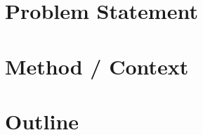\documentclass[USenglish]{uit-thesis}
\begin{document}
\section{Problem Statement}
\label{sec:probdefinition}




\section{Method / Context}
\label{sec:method}

\section{Outline}
\label{sec:outline}
\end{document}
